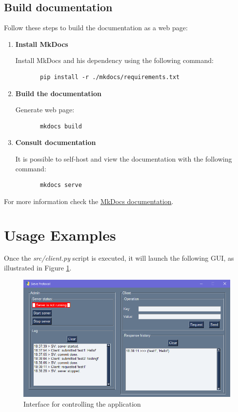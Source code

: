 \documentclass{scrartcl}
\begin{document}
\subsection{Build documentation}

Follow these steps to build the documentation as a web page:

\begin{enumerate}
   \item \textbf{Install MkDocs}
   
   Install MkDocs and his dependency using the following command:

   \begin{verbatim}
       pip install -r ./mkdocs/requirements.txt
   \end{verbatim}

   \item \textbf{Build the documentation}
   
   Generate web page:

   \begin{verbatim}
       mkdocs build
   \end{verbatim}

   \item \textbf{Consult documentation}
   
   It is possible to self-host and view the documentation with the following command:

   \begin{verbatim}
       mkdocs serve
   \end{verbatim}

\end{enumerate}


For more information check the \href{https://www.mkdocs.org/user-guide/}{MkDocs documentation}.

\section{Usage Examples}

Once the \textit{src/client.py} script is executed, it will launch the following GUI, as illustrated in Figure \ref{fig:gui}.

\begin{figure}[H]
    \centering
    \includegraphics[width=.9\linewidth]{figures/gui.png}
    \caption{Interface for controlling the application}
    \label{fig:gui} 
\end{figure}
\end{document}
